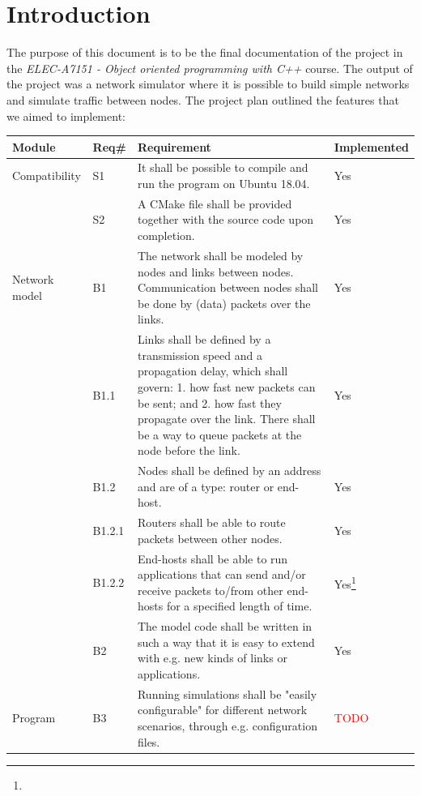 \newpage
\section{Introduction} 

The purpose of this document is to be the final documentation of the project in the \textit{ELEC-A7151 - Object oriented programming with C++} course. The output of the project was a network simulator  where it is possible to build simple networks and simulate traffic between nodes. The project plan outlined the features that we aimed to implement:

\begin{table}[!htbp]
\footnotesize{
\begin{tabular}{p{}|p{}|p{}|p{}}
\textbf{Module} & \textbf{Req\#} & \textbf{Requirement} & \textbf{Implemented} \\
\hline Compatibility
& S1        & It shall be possible to compile and run the program on Ubuntu 18.04. & Yes\\
& S2        & A CMake file shall be provided together with the source code upon completion. & Yes\\
\hline Network model   
& B1        & The network shall be modeled by nodes and links between nodes. Communication between nodes shall be done by (data) packets over the links.  & Yes \\
& B1.1      & Links shall be defined by a transmission speed and a propagation delay, which shall govern: 1. how fast new packets can be sent; and 2. how fast they propagate over the link. There shall be a way to queue packets at the node before the link. & Yes \\
& B1.2      & Nodes shall be defined by an address and are of a type: router or end-host. & Yes\\
& B1.2.1    & Routers shall be able to route packets between other nodes. & Yes\\
& B1.2.2    & End-hosts shall be able to run applications that can send and/or receive packets to/from other end-hosts for a specified length of time. & Yes\footnote{}\\
& B2        & The model code shall be written in such a way that it is easy to extend with e.g. new kinds of links or applications. & Yes\\ 
\hline Program
& B3        & Running simulations shall be "easily configurable" for different network scenarios, through e.g. configuration files. & \textcolor{red}{TODO}\\

\end{tabular}}
\end{table}
